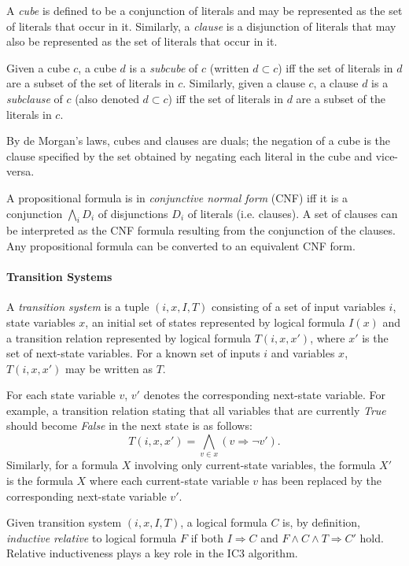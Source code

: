 \documentclass[12pt,a4paper,twoside,openright]{report}
\begin{document}
{{A \emph{cube} is defined to be a conjunction of literals and may be represented as the set
of literals that occur in it. Similarly, a \emph{clause} is a disjunction of literals that
may also be represented as the set of literals that occur in it.

Given a cube $c$, a cube $d$ is a \emph{subcube} of $c$ (written $d \subset c$)
iff the set of literals in $d$ are a subset of the set of literals in $c$.
Similarly, given a clause $c$, a clause $d$ is a \emph{subclause} of $c$ (also
denoted $d \subset c$) iff the set of literals in $d$ are a subset of
the literals in $c$.

By de Morgan's laws, cubes and clauses are duals; the negation of a cube is the
clause specified by the set obtained by negating each literal in the cube
and vice-versa.

A propositional formula is in \emph{conjunctive normal form} (CNF) iff it is a conjunction 
$\bigwedge_i D_i$ of disjunctions $D_i$ of literals (i.e. clauses). A set of clauses
can be interpreted as the CNF formula resulting from the conjunction
of the clauses. Any propositional formula can be converted to an equivalent CNF
form.}

\paragraph{Transition Systems}{
A \emph{transition system} is a tuple $(i,x,I,T)$ consisting of a set of input
variables $i$, state variables $x$, an initial
set of states represented by logical formula $I(x)$ and
a transition relation represented by logical formula $T(i,x,x')$,
where $x'$ is the set of next-state variables. 
For a known set of inputs $i$ and variables $x$, $T(i,x,x')$ may be written
as $T$.

For each state variable $v$, $v'$ denotes the corresponding next-state variable.
For example, a transition relation stating that all variables that are
currently {\it True} should become {\it False} in the next state is as follows:
$$T(i,x,x') = \bigwedge_{v \in x} (v \Rightarrow \neg v').$$
Similarly, for a formula $X$ involving only current-state variables,
the formula $X'$ is the formula $X$ where each current-state variable $v$ has
been replaced by the corresponding next-state variable $v'$.

Given transition system $(i,x,I,T)$, a logical formula $C$ is, by definition,
\emph{inductive relative} to logical formula $F$ if both
$I \Rightarrow C$ and $F \wedge C \wedge T \Rightarrow C'$ hold.
Relative inductiveness plays a key role in the IC3 algorithm.
}

}
\end{document}

